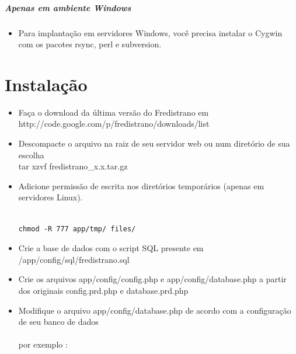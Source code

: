 \documentclass[12pt,a4paper]{report}
\begin{document}
\paragraph*{Apenas em ambiente Windows}
\begin{itemize}
\item
Para implantação em servidores Windows, você precisa instalar o Cygwin com os pacotes rsync, perl e subversion.

\end{itemize}

\chapter{Instalação}
\begin{itemize}
\item Faça o download da última versão do Fredistrano em\\ http://code.google.com/p/fredistrano/downloads/list
\item Descompacte o arquivo na raiz de seu servidor web ou num diretório de sua escolha \: \\
tar xzvf fredistrano\_x.x.tar.gz \\
\item Adicione permissão de escrita nos diretórios temporários (apenas em servidores Linux).\\
\begin{verbatim}

chmod -R 777 app/tmp/ files/

\end{verbatim}

\item Crie a base de dados com o script SQL presente em \\ /app/config/sql/fredistrano.sql\\
\item Crie os arquivos app/config/config.php e app/config/database.php a partir dos originais config.prd.php e database.prd.php\newpage

\item Modifique o arquivo app/config/database.php de acordo com a configuração de seu banco de dados\\\\por exemplo :\\

\lstset{language=Php}
\lstset{commentstyle=\textit}


\end{itemize}
\end{document}
